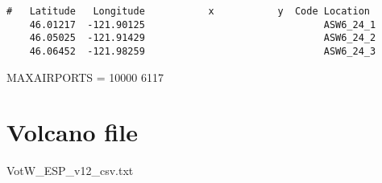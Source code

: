 \small
\begin{verbatim}
#   Latitude   Longitude           x           y  Code Location
    46.01217  -121.90125                               ASW6_24_1
    46.05025  -121.91429                               ASW6_24_2
    46.06452  -121.98259                               ASW6_24_3
\end{verbatim}
\normalsize

MAXAIRPORTS = 10000
6117

\section{Volcano file}
VotW\_ESP\_v12\_csv.txt



